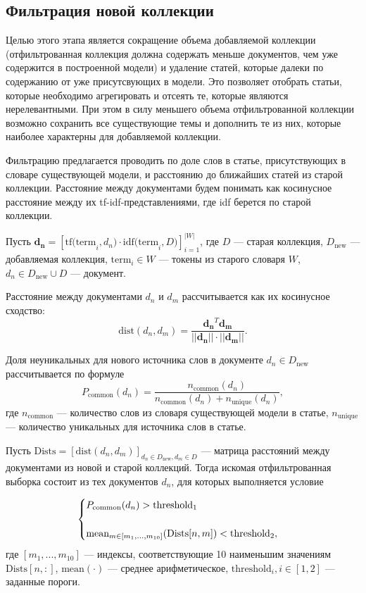 \subsection{Фильтрация новой коллекции}
Целью этого этапа является сокращение объема добавляемой коллекции (отфильтрованная коллекция должна содержать меньше документов, чем уже содержится в построенной модели) и удаление статей, которые далеки по содержанию от уже присутсвующих в модели. Это позволяет отобрать статьи, которые необходимо агрегировать и отсеять те, которые являются нерелевантными. При этом в силу меньшего объема отфильтрованной коллекции
возможно сохранить все существующие темы и дополнить те из них, которые наиболее характерны для добавляемой коллекции.

Фильтрацию предлагается проводить по доле слов в статье, присутствующих в словаре существующей модели, и расстоянию до ближайших статей из старой коллекции. Расстояние между документами будем понимать как косинусное расстояние между их tf-idf-представлениями, где idf берется по старой коллекции.

Пусть $\boldsymbol{d_n }= [ \text{tf(term}_i, d_n) \cdot \text{idf(term}_i, D) ]_{i=1}^{|W|}$, где $D$ --- старая коллекция, $D_{\text{new}}$ --- добавляемая коллекция, $\text{term}_i \in W$ --- токены из старого словаря $W$, $d_n \in D_{\text{new}} \cup D$ --- документ.

Расстояние между документами $d_n$ и $d_m$ рассчитывается как их косинусное сходство:
$$\text{dist}(d_n, d_m) = \dfrac{\boldsymbol{d_n }^T \boldsymbol{d_m }}{||\boldsymbol{d_n }|| \cdot ||\boldsymbol{d_m }||}.$$

Доля неуникальных для нового источника слов в документе $d_n \in D_{\text{new}}$ рассчитывается по формуле
$$P_{\text{common}}(d_n) = \dfrac{n_{\text{common}}(d_n)}{n_{\text{common}}(d_n)+n_{\text{unique}}(d_n)},$$ где $n_{\text{common}}$ --- количество слов из словаря существующей модели в статье, $n_{\text{unique}}$ --- количество уникальных для источника слов в статье.

Пусть $\text{Dists} = [ \text{dist}(d_n, d_m)]_{d_n \in D_{\text{new}}, d_m \in D }$ --- матрица расстояний между документами из новой и старой коллекций. Тогда искомая отфильтрованная выборка состоит из тех документов $d_n$, для которых выполняется условие

\begin{equation}
 \begin{cases}
   P_{\text{common}}(d_n) > \text{threshold}_1 \\
   \\
   \text{mean}_{m \in [m_1, ..., m_{10}]}(\text{Dists}[n,m])< \text{threshold}_2,
   \end{cases} \notag
\end{equation}
где $[m_1, ..., m_{10}]$ --- индексы, соответствующие 10 наименьшим значениям $\text{Dists}[n,:]$, $\text{mean}(\cdot)$ --- среднее арифметическое,   $\text{threshold}_i, i \in [1,2]$ --- заданные пороги.

